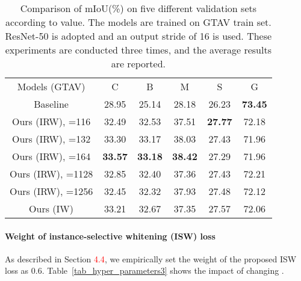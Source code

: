 \documentclass[final]{latex/cvpr}
\newcommand{\drule}{\specialrule{0.2pt}{1pt}{1pt}\specialrule{0.2pt}{0pt}{\belowrulesep}}
\newcommand{\todow}[1]{\textcolor{red}{#1}}
\begin{document}
\begin{table}[t!]
\vspace{-0.0cm}
\begin{center}
\footnotesize
\begin{tabular}{c|c|c|c|c||c}
\toprule
Models (GTAV) & C & B & M & S & G \\
\drule
Baseline & 28.95 & 25.14 & 28.18 & 26.23 & \textbf{73.45}  \\ 
\midrule
Ours (IRW), =116 &  32.49 & 32.53 & 37.51 &  \textbf{27.77} & 72.18      \\ 
\midrule
Ours (IRW), =132 & 33.30 & 33.17  &  38.03   &   27.43   &   71.96   \\ 
\midrule
Ours (IRW), =164 & \textbf{33.57} & \textbf{33.18}   & \textbf{38.42}  &  27.29   &  71.96 \\ 
\midrule
Ours (IRW), =1128 & 32.85 & 32.40 & 37.36 & 27.43 & 72.21      \\ 
\midrule
Ours (IRW), =1256 & 32.45 & 32.32 & 37.93  & 27.48 & 72.12   \\ 
\midrule
Ours (IW) & 33.21 & 32.67 & 37.35 & 27.57 & 72.06 \\ 
\bottomrule
\end{tabular}
\end{center}
\vspace*{-0.2cm}
\caption{Comparison of mIoU(\%) on five different validation sets according to  value. The models are trained on GTAV train set. ResNet-50 is adopted and an output stride of 16 is used. These experiments are conducted three times, and the average results are reported.}
\label{tab_hyper_parameters2}
\vspace{-0.2cm}
\end{table}

\paragraph{Weight  of instance-selective whitening (ISW) loss}
\vspace*{-0.3cm}
As described in Section \todow{4.4}, we empirically set the weight  of the proposed ISW loss as 0.6. Table~\ref{tab_hyper_parameters3} shows the impact of changing .
\end{document}
